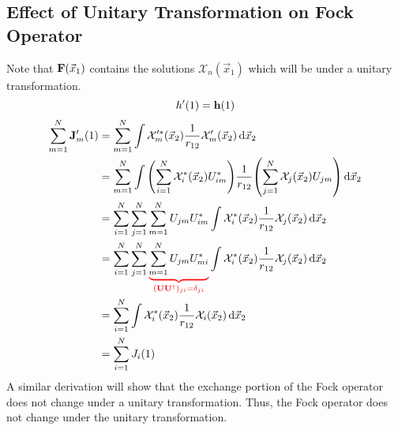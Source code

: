 \documentclass[12pt,a4paper,titlepage]{article}
\newcommand{\Chi}{\mathcal{X}} %
\begin{document}
\subsection{Effect of Unitary Transformation on Fock Operator}
Note that $\vb{F}(\vec{x}_{1})$ contains the solutions $\Chi_{n}(\vec{x}_{1})$ which will be under a unitary transformation.
\begin{equation}
h^{\prime}(1)=\vb{h}(1)
\end{equation}
\begin{equation}
\begin{aligned}
\sum_{m=1}^{N}\vb{J}_{m}^{\prime}(1)&=\sum_{m=1}^{N}\int\Chi_{m}^{\prime *}(\vec{x}_{2})\frac{1}{r_{12}}\Chi_{m}^{\prime}(\vec{x}_{2})\dd{\vec{x}_{2}}\\
&=\sum_{m=1}^{N}\int\qty(\sum_{i=1}^{N}\Chi_{i}^{*}(\vec{x}_{2})U_{im}^{*})\frac{1}{r_{12}}\qty(\sum_{j=1}^{N}\Chi_{j}(\vec{x}_{2})U_{jm})\dd{\vec{x}_{2}}\\
&=\sum_{i=1}^{N}\sum_{j=1}^{N}\sum_{m=1}^{N}U_{jm}U_{im}^{*}\int\Chi_{i}^{*}(\vec{x}_{2})\frac{1}{r_{12}}\Chi_{j}(\vec{x}_{2})\dd{\vec{x}_{2}}\\
&=\sum_{i=1}^{N}\sum_{j=1}^{N}{\color{red}\underbrace{\color{black}\sum_{m=1}^{N}U_{jm}U_{mi}^{*}}_{(\vb{U}\vb{U}^{\dagger})_{ji}=\delta_{ji}}}\int\Chi_{i}^{*}(\vec{x}_{2})\frac{1}{r_{12}}\Chi_{j}(\vec{x}_{2})\dd{\vec{x}_{2}}\\
&=\sum_{i=1}^{N}\int\Chi_{i}^{*}(\vec{x}_{2})\frac{1}{r_{12}}\Chi_{i}(\vec{x}_{2})\dd{\vec{x}_{2}}\\
&=\sum_{i=1}^{N}J_{i}(1)
\end{aligned}
\end{equation}
A similar derivation will show that the exchange portion of the Fock operator does not change under a unitary transformation. Thus, the Fock operator does not change under the unitary transformation.
\end{document}

